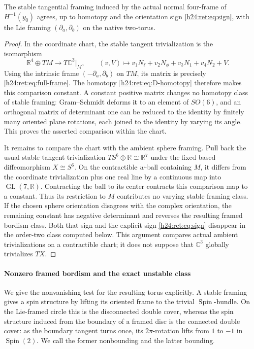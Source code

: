 \begin{proposition}
The stable tangential framing induced by the actual normal four-frame
of \(H^{-1}(y_0)\) agrees, up to homotopy and the orientation sign
\eqref{h24:ret:eq:sign}, with the Lie framing
\((\partial_a,\partial_b)\) on the native two-torus.
\end{proposition}
\begin{proof}
In the coordinate chart, the stable tangent trivialization is the
isomorphism
\[
 \mathbb R^4\oplus TM\longrightarrow T\mathbb C^3|_M,
 \qquad (v,V)\longmapsto
 v_1N_\ell+v_2N_\phi+v_3N_1+v_4N_2+V.
\]
Using the intrinsic frame \((-\partial_a,\partial_b)\) on \(TM\),
its matrix is precisely \eqref{h24:ret:eq:full-frame}.  The homotopy
\eqref{h24:ret:eq:D-homotopy} therefore makes this comparison constant.
A constant positive matrix changes no homotopy class of stable
framing: Gram--Schmidt deforms it to an element of \(SO(6)\), and
an orthogonal matrix of determinant one can be reduced to the identity
by finitely many oriented plane rotations, each joined to the
identity by varying its angle.  This proves the asserted comparison
within the chart.

It remains to compare the chart with the ambient sphere framing.
Pull back the usual stable tangent trivialization
\(TS^6\oplus\mathbb R\cong\mathbb R^7\) under the fixed based diffeomorphism
\(X\cong S^6\).  On the contractible \(w\)-ball containing \(M\),
it differs from the coordinate trivialization plus one real line by
a continuous map into \(\operatorname{GL}(7,\mathbb R)\).  Contracting the ball to its
center contracts this comparison map to a constant.  Thus its
restriction to \(M\) contributes no varying stable framing class.
If the chosen sphere orientation disagrees with the complex
orientation, the remaining constant has negative determinant and
reverses the resulting framed bordism class.  Both that sign and the
explicit sign \eqref{h24:ret:eq:sign} disappear in the order-two class
computed below.  This argument compares actual ambient
trivializations on a contractible chart; it does not suppose that
\(\mathbb C^3\) globally trivializes \(TX\).
\end{proof}

\paragraph{Nonzero framed bordism and the exact unstable class}

We give the nonvanishing test for the resulting torus explicitly.
A stable framing gives a spin structure by lifting its oriented frame
to the trivial \(\operatorname{Spin}\)-bundle.  On the Lie-framed
circle this is the disconnected double cover, whereas the spin
structure induced from the boundary of a framed disc is the
connected double cover: as the boundary tangent turns once, its
\(2\pi\)-rotation lifts from \(1\) to \(-1\) in
\(\operatorname{Spin}(2)\).  We call the former nonbounding and the
latter bounding.


